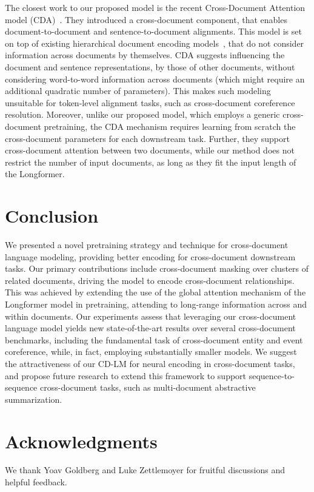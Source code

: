 \documentclass[11pt,a4paper]{article}
\begin{document}
The closest work to our proposed model is the recent Cross-Document Attention model (CDA)~\cite{zhou-etal-2020-multilevel}. They introduced a cross-document component, that enables document-to-document and sentence-to-document alignments. This model is set on top of existing hierarchical document encoding models~\cite{sun-etal-2018-stance,liu-lapata-2019-hierarchical,guo-etal-2019-hierarchical}, that do not consider information across documents by themselves. CDA suggests influencing the document and sentence representations, by those of other documents, without considering word-to-word information across documents (which might require an additional quadratic number of parameters). This makes such modeling unsuitable for token-level alignment tasks, such as cross-document coreference resolution. Moreover, unlike our proposed model, which employs a generic cross-document pretraining, the CDA mechanism requires learning from scratch the cross-document parameters for each downstream task. Further, they support cross-document attention between two documents, while our method does not restrict the number of input documents, as long as they fit the input length of the Longformer. \section{Conclusion}
We presented a novel pretraining strategy and technique for cross-document language modeling, providing better encoding for cross-document downstream tasks. 
Our primary contributions include cross-document masking over clusters of related documents, driving the model to encode cross-document relationships. This was achieved by extending the use of the global attention mechanism of the Longformer model \cite{beltagy2020longformer} in pretraining, attending to long-range information across and within documents. 
Our experiments assess that leveraging our cross-document language model yields new state-of-the-art results over several cross-document benchmarks, including the fundamental task of cross-document entity and event coreference, while, in fact, employing substantially smaller models. We suggest the attractiveness of our CD-LM for neural encoding in cross-document tasks, and propose future research to extend this framework to support sequence-to-sequence cross-document tasks, such as multi-document abstractive summarization. \section*{Acknowledgments}
We thank Yoav Goldberg and Luke Zettlemoyer for fruitful discussions and helpful feedback. 


\end{document}
